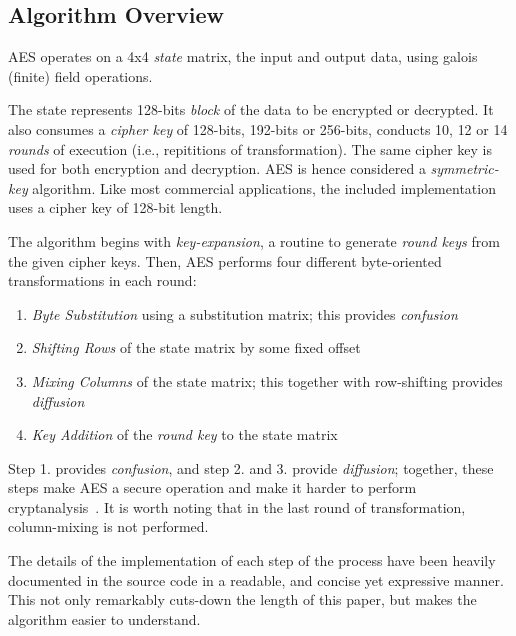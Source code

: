 \documentclass[letterpaper,twocolumn,10pt]{article}
\begin{document}
\subsection{Algorithm Overview}
AES operates on a 4x4 \textit{state} matrix, the input and output data, using galois (finite) field operations.

The state represents 128-bits \textit{block} of the data to be encrypted or decrypted.
It also consumes a \textit{cipher key} of {128-bits}, {192-bits} or {256-bits}, conducts 10, 12 or 14 \textit{rounds} of execution (i.e., repititions of transformation).
The same cipher key is used for both encryption and decryption. AES is hence considered a \textit{symmetric-key} algorithm.
Like most commercial applications, the included implementation uses a cipher key of 128-bit length.

The algorithm begins with \textit{key-expansion}, a routine to generate \textit{round keys} from the given cipher keys.
Then, AES performs four different byte-oriented transformations in each round:
\begin{enumerate}
    \item \textit{Byte Substitution} using a substitution matrix; this provides \textit{confusion}~\cite{shanon}
    \item \textit{Shifting Rows} of the state matrix by some fixed offset
    \item \textit{Mixing Columns} of the state matrix; this together with row-shifting provides \textit{diffusion}~\cite{shanon}
    \item \textit{Key Addition} of the \textit{round key} to the state matrix
\end{enumerate}

Step 1. provides \textit{confusion}, and step 2. and 3. provide \textit{diffusion}; together, these steps make AES a secure operation and make it harder to perform cryptanalysis~\cite{shanon}.
It is worth noting that in the last round of transformation, column-mixing is not performed.

The details of the implementation of each step of the process have been heavily documented in the source code in a readable, and concise yet expressive manner. This not only remarkably cuts-down the length of this paper, but makes the algorithm easier to understand. 
\end{document}
